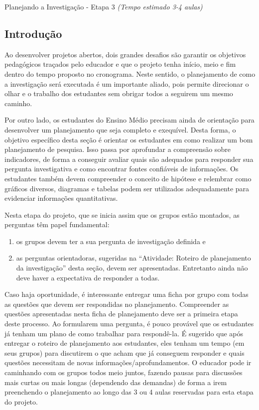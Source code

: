 \clearpage
\begin{paginatexto}{Planejando a Investigação - Etapa 3}
\textit{(Tempo estimado 3-4 aulas)}

\subsection{Introdução}
Ao desenvolver projetos abertos, dois grandes desafios são garantir os objetivos pedagógicos traçados pelo educador e que o projeto tenha início, meio e fim dentro do tempo proposto no cronograma. Neste sentido, o planejamento de como a investigação será executada é um importante aliado, pois permite direcionar o olhar e o trabalho dos estudantes sem obrigar todos a seguirem um mesmo caminho.

Por outro lado, os estudantes do Ensino Médio precisam ainda de orientação para desenvolver um planejamento que seja completo e exequível.
Desta forma, o objetivo específico desta seção é orientar os estudantes em como realizar um bom planejamento de pesquisa. Isso passa por aprofundar a compreensão sobre indicadores, de forma a conseguir avaliar quais são adequados para responder sua pergunta investigativa e como encontrar fontes confiáveis de informações. Os estudantes também devem compreender o conceito de hipótese e relembrar como gráficos diversos, diagramas e tabelas podem ser utilizados adequadamente para evidenciar informações quantitativas.

Nesta etapa do projeto, que se inicia assim que os grupos estão montados, as perguntas têm papel fundamental: 

\begin{enumerate}
\item os grupos devem ter a sua pergunta de investigação definida e 
 
\item as perguntas orientadoras, sugeridas na “Atividade: Roteiro de planejamento da investigação” desta seção, devem ser apresentadas. Entretanto ainda não deve haver a expectativa de responder a todas.
 \end{enumerate} 

Caso haja oportunidade, é interessante entregar uma ficha por grupo com todas as questões que devem ser respondidas no planejamento. Compreender as questões apresentadas nesta ficha de planejamento deve ser a primeira etapa deste processo. Ao formularem uma pergunta, é pouco provável que os estudantes já tenham um plano de como trabalhar para respondê-la. 
É sugerido que após entregar o roteiro de planejamento aos estudantes, eles tenham um tempo (em seus grupos) para discutirem o que acham que já conseguem responder e quais questões necessitam de novas informações/aprofundamentos. O educador pode ir caminhando com os grupos todos meio juntos, fazendo pausas para discussões mais curtas ou mais longas (dependendo das demandas) de forma a irem preenchendo o planejamento ao longo das 3 ou 4 aulas reservadas para esta etapa do projeto.


\end{paginatexto}
